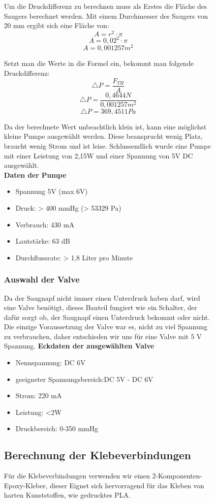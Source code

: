 \begin{figure}
Um die Druckdifferenz zu berechnen muss als Erstes die Fläche des Saugers berechnet werden.
Mit einem Durchmesser des Saugers von 20 mm ergibt sich eine Fläche von:
\[A=r^{2}\cdot \pi\]
\[A=0,02^{2}\cdot \pi\]
\[A=0,001257m^{2}\]

Setzt man die Werte in die Formel ein, bekommt man folgende Druckdifferenz:
\[\triangle P=\frac{F_{TH}}{A}\]
\[\triangle P=\frac{0,4644N}{0,001257m^{2}}\]
\[\triangle P=369,4511Pa\]

Da der berechnete Wert unbeachtlich klein ist, kann eine möglichst kleine Pumpe ausgewählt werden. Diese beansprucht
wenig Platz, braucht wenig Strom und ist leise. Schlussendlich wurde eine Pumpe mit einer Leistung von 2,15W und einer
Spannung von 5V DC ausgewählt.\\
\textbf{Daten der Pumpe}
\begin{itemize}
    \item Spannung 5V (max 6V)
    \item Druck: > 400 mmHg (> 53329 Pa)
    \item Verbrauch: 430 mA
    \item Lautstärke: 63 dB
    \item Durchflussrate: > 1,8 Liter pro Minute
\end{itemize}



\subsubsection{Auswahl der Valve}
Da der Saugnapf nicht immer einen Unterdruck haben darf, wird eine Valve benötigt, dieses Bauteil fungiert wie ein
Schalter, der dafür sorgt ob, der Saugnapf einen Unterdruck bekommt oder nicht. Die einzige Voraussetzung  der Valve war es, nicht zu viel Spannung zu verbrauchen, daher entschieden
wir uns für eine Valve mit 5 V Spannung.
\textbf{Eckdaten der ausgewählten Valve}
\begin{itemize}
    \item Nennspannung: DC 6V
    \item geeigneter Spannungsbereich:DC 5V - DC 6V
    \item Strom: 220 mA
    \item Leistung: <2W
    \item Druckbereich: 0-350 mmHg
\end{itemize}

\subsection{Berechnung der Klebeverbindungen}
Für die Klebeverbindungen verwenden wir einen 2-Komponenten-Epoxy-Kleber, dieser Eignet sich hervorragend für das
Kleben von harten Kunststoffen, wie gedrucktes PLA.


\end{figure}
